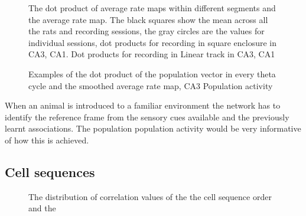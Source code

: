 \begin{figure}[htb!]
\centering
{}
\caption[Population Vector time course]{The dot product of average rate maps within different segments and the average rate map. The black squares show the mean across all the rats and recording sessions, the gray circles are the values for individual sessions, dot products for recording in square enclosure in  CA3,  CA1. Dot products for recording in Linear track in  CA3,  CA1}
\end{figure}

\begin{figure}[htb!]
\centering
{}
\caption[CA3 Population Vector analysis]{ Examples of the dot product of the population vector in every theta cycle and the smoothed average rate map,  CA3 Population activity}
\end{figure}

When an animal is introduced to a familiar environment the network has to identify the reference frame from the sensory cues available and the previously learnt associations. The population population activity would be very informative of how this is achieved.\\

\newpage

\subsection{Cell sequences}
\begin{figure}[HTB!]
\centering
{}
\caption[CA3 post-trial sleep template match analysis]{The distribution of correlation values of the the cell sequence order and the }
\label{tmcorr}
\end{figure}
\section{}
